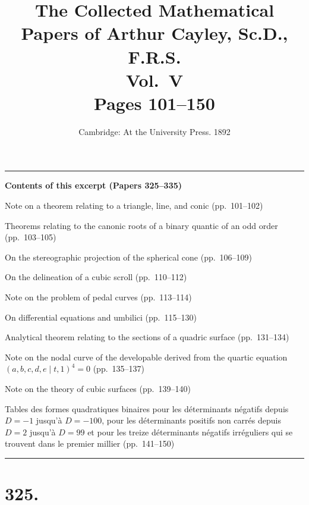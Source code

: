 \documentclass[11pt,a4paper]{article}
\title{\textbf{The Collected Mathematical Papers of Arthur Cayley, Sc.D., F.R.S.}\\[6pt]
\Large Vol.\ V\\[12pt]
\large Pages 101--150}
\author{}
\date{Cambridge: At the University Press. 1892}
\begin{document}
\maketitle
\thispagestyle{empty}

\vspace{2em}
\noindent\rule{\textwidth}{0.4pt}
\vspace{1em}

\begin{center}
\textbf{Contents of this excerpt (Papers 325--335)}
\end{center}

\begin{enumerate}[label={[\arabic*]}]
\setcounter{enumi}{324}
\item Note on a theorem relating to a triangle, line, and conic (pp.\ 101--102)
\item Theorems relating to the canonic roots of a binary quantic of an odd order (pp.\ 103--105)
\item On the stereographic projection of the spherical cone (pp.\ 106--109)
\item On the delineation of a cubic scroll (pp.\ 110--112)
\item Note on the problem of pedal curves (pp.\ 113--114)
\item On differential equations and umbilici (pp.\ 115--130)
\item Analytical theorem relating to the sections of a quadric surface (pp.\ 131--134)
\item Note on the nodal curve of the developable derived from the quartic equation $(a,b,c,d,e\mid t,1)^4=0$ (pp.\ 135--137)
\item Note on the theory of cubic surfaces (pp.\ 139--140)
\item Tables des formes quadratiques binaires pour les d\'{e}terminants n\'{e}gatifs depuis $D=-1$ jusqu'\`{a} $D=-100$, pour les d\'{e}terminants positifs non carr\'{e}s depuis $D=2$ jusqu'\`{a} $D=99$ et pour les treize d\'{e}terminants n\'{e}gatifs irr\'{e}guliers qui se trouvent dans le premier millier (pp.\ 141--150)
\end{enumerate}

\vspace{1em}
\noindent\rule{\textwidth}{0.4pt}
\vspace{2em}

\section*{325.}
\end{document}
